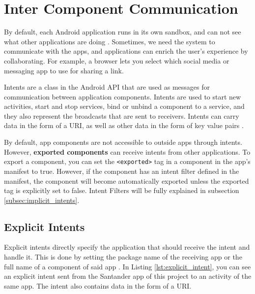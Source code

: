     
    
    \section{Inter Component Communication}
        \label{sec:inter_component_communication}
    
    By default, each Android application runs in its own sandbox, and can not see what other applications are doing \cite{android_app_fundamentals}. Sometimes, we need the system to communicate with the apps, and applications can enrich the user's experience by collaborating. For example, a browser lets you select which social media or messaging app to use for sharing a link.
    
    Intents are a class in the Android API that are used as messages for communication between application components. Intents are used to start new activities, start and stop services, bind or unbind a component to a service, and they also represent the broadcasts that are sent to receivers. Intents can carry data in the form of a URI, as well as other data in the form of key value pairs \cite{intents}.
        
    By default, app components are not accessible to outside apps through intents. However, \textbf{exported components} can receive intents from other applications. To export a component, you can set the \lstinline|<exported>| tag in a component in the app’s manifest to true. However, if the component has an intent filter defined in the manifest, the component will become automatically exported unless the exported tag is explicitly set to false. Intent Filters will be fully explained in subsection \ref{subsec:implicit_intents}.
    
    \subsection{Explicit Intents}
        \label{subsec:explicit_intents}
        
    Explicit intents directly specify the application that should receive the intent and handle it. This is done by setting the package name of the receiving app or the full name of a component of said app \cite{intents_and_intent_filters}. In Listing \ref{lst:explicit_intent}, you can see an explicit intent sent from the Santander app of this project to an activity of the same app. The intent also contains data in the form of a URI.
    

